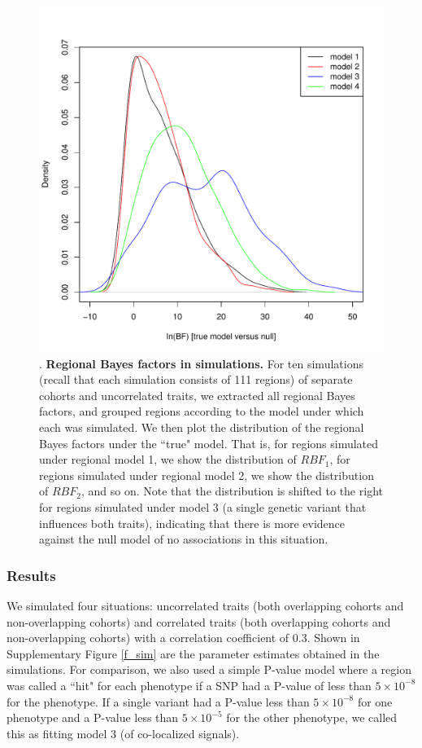 \documentclass[11pt,titlepage]{article}
\begin{document}
\begin{figure}
\begin{center}
\includegraphics[scale = 0.6]{figs/bfs_sim.pdf}
\caption{. \textbf{Regional Bayes factors in simulations.} For ten simulations (recall that each simulation consists of 111 regions) of separate cohorts and uncorrelated traits, we extracted all regional Bayes factors, and grouped regions according to the model under which each was simulated. We then plot the distribution of the regional Bayes factors under the ``true" model. That is, for regions simulated under regional model 1, we show the distribution of $RBF_1$, for regions simulated under regional model 2, we show the distribution of $RBF_2$, and so on. Note that the distribution is shifted to the right for regions simulated under model 3 (a single genetic variant that influences both traits), indicating that there is more evidence against the null model of no associations in this situation.}\label{f_bfsim}
\end{center}
\end{figure}


\subsubsection{Results}
We simulated four situations: uncorrelated traits (both overlapping cohorts and non-overlapping cohorts) and correlated traits (both overlapping cohorts and non-overlapping cohorts) with a correlation coefficient of 0.3. Shown in Supplementary Figure \ref{f_sim} are the parameter estimates obtained in the simulations. For comparison, we also used a simple P-value model where a region was called a ``hit" for each phenotype if a SNP had a P-value of less than $5\times 10^{-8}$ for the phenotype. If a single variant had a P-value less than $5\times10^{-8}$ for one phenotype and a P-value less than $5\times10^{-5}$ for the other phenotype, we called this as fitting model 3 (of co-localized signals). 
\end{document}
